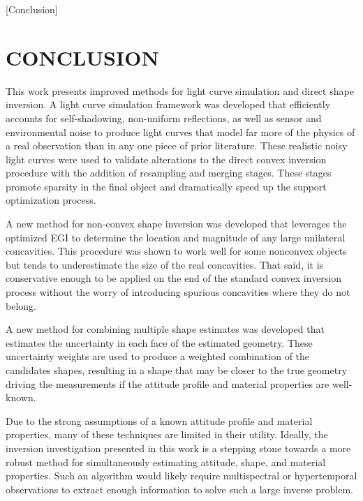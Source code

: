 [Conclusion]

\chapter{CONCLUSION}

This work presents improved methods for light curve simulation and direct shape inversion. A light curve simulation framework was developed that efficiently accounts for self-shadowing, non-uniform reflections, as well as sensor and environmental noise to produce light curves that model far more of the physics of a real observation than in any one piece of prior literature. These realistic noisy light curves were used to validate alterations to the direct convex inversion procedure with the addition of resampling and merging stages. These stages promote sparsity in the final object and dramatically speed up the support optimization process. 

A new method for non-convex shape inversion was developed that leverages the optimized EGI to determine the location and magnitude of any large unilateral concavities. This procedure was shown to work well for some nonconvex objects but tends to underestimate the size of the real concavities. That said, it is conservative enough to be applied on the end of the standard convex inversion process without the worry of introducing spurious concavities where they do not belong.

A new method for combining multiple shape estimates was developed that estimates the uncertainty in each face of the estimated geometry. These uncertainty weights are used to produce a weighted combination of the candidates shapes, resulting in a shape that may be closer to the true geometry driving the measurements if the attitude profile and material properties are well-known. 

Due to the strong assumptions of a known attitude profile and material properties, many of these techniques are limited in their utility. Ideally, the inversion investigation presented in this work is a stepping stone towards a more robust method for simultaneously estimating attitude, shape, and material properties. Such an algorithm would likely require multispectral or hypertemporal observations to extract enough information to solve such a large inverse problem.


